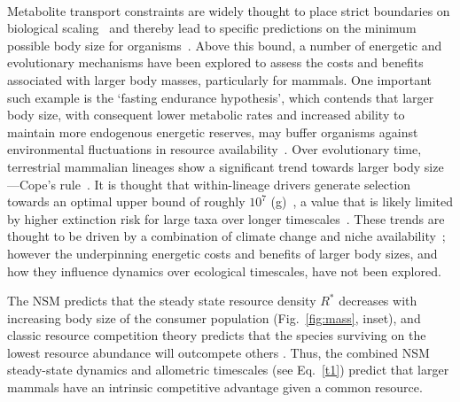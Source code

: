 \documentclass[twocolumn,preprintnumbers,amsmath,amssymb,superscriptaddress]{revtex4}
\begin{document}
\\
Metabolite transport constraints are widely thought to place strict boundaries on biological
scaling~\citep{Brown:1993p708,West:1997cg,Brown:2004wq} and thereby lead to
specific predictions on the minimum possible body size for
organisms~\citep{West:2002ud}.  Above this bound, a number of energetic and
evolutionary mechanisms have been explored to assess the costs and benefits
associated with larger body masses, particularly for mammals.  One important
such example is the `fasting endurance hypothesis', which contends that
larger body size, with consequent lower metabolic rates and increased ability
to maintain more endogenous energetic reserves, may buffer organisms against
environmental fluctuations in resource availability~\citep{Millar:1990p923}.
Over evolutionary time, terrestrial mammalian lineages show a significant
trend towards larger body size---Cope's
rule~\citep{Alroy:1998p1594,Clauset:2009fh,Smith:2010p3442,Saarinen:2014br}.
It is thought that within-lineage drivers generate selection towards an
optimal upper bound of roughly $10^7$ (g)~\citep{Alroy:1998p1594}, a value
that is likely limited by higher extinction risk for large taxa over longer
timescales~\citep{Clauset:2009fh}.  These trends are thought to be driven by
a combination of climate change and niche
availability~\citep{Saarinen:2014br}; however the underpinning energetic
costs and benefits of larger body sizes, and how they influence dynamics over
ecological timescales, have not been explored.


The NSM predicts that the steady state resource density $R^{*}$ decreases
with increasing body size of the consumer population (Fig.~\ref{fig:mass},
inset), and classic resource competition theory predicts that the species
surviving on the lowest resource abundance will outcompete others
\citep{tilman1981,dutkiewicz2009,barton2010}. Thus, the combined NSM
steady-state dynamics and allometric timescales (see Eq.~\eqref{t1}) predict
that larger mammals have an intrinsic competitive advantage given a common
resource.  
\end{document}
